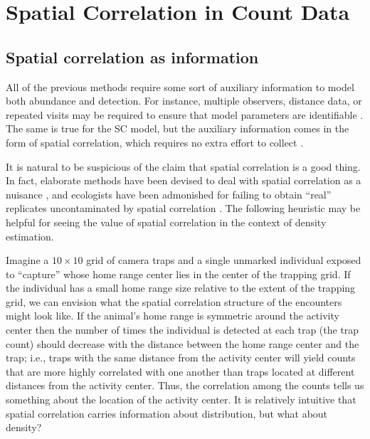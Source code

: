 \section{Spatial Correlation in Count Data}

\subsection{Spatial correlation as information}
\label{sect.corr-info}

All of the previous methods require some sort of auxiliary information
to model both abundance and detection. For instance, %
multiple observers, distance data, or repeated visits
may be required to ensure
that model parameters are identifiable
\citep[but see][]{lele_etal:2012, solymos_etal:2012}. The same is true for
the SC model, but the auxiliary information comes in the form of spatial
correlation, which requires no extra effort to collect
\citep{chandler_royle:2012}. %

It is natural to be suspicious of the claim that spatial correlation
is a good thing. In fact, elaborate methods have been devised to deal
with spatial correlation as a nuisance %
\citep{lichstein_etal:2002,dormann_etal:2007}, and ecologists have been admonished for
failing to obtain ``real'' replicates uncontaminated by spatial
correlation \citep{hurlbert:1984}. The following heuristic may be
helpful for seeing the value of spatial correlation
in the context of density estimation.

Imagine a $10 \times 10$ grid of camera traps and a single unmarked
individual exposed to ``capture'' whose home range center lies in the center of the
trapping grid. If the individual has a small home range size relative
to the extent of the trapping grid, we can envision what the
spatial correlation structure of the encounters might look
like. If the animal's home range is symmetric around the activity center
then the number of times the individual is detected at each
trap (the trap count) should decrease with the distance between the home
range center and the trap; i.e., traps with the same distance
from the activity center will yield counts that are more highly
correlated with one another than traps located at different distances
from the activity center. Thus, the correlation among the counts tells us
something about the location of the activity center. It is relatively
intuitive that spatial correlation carries information about
distribution, but what about density?


